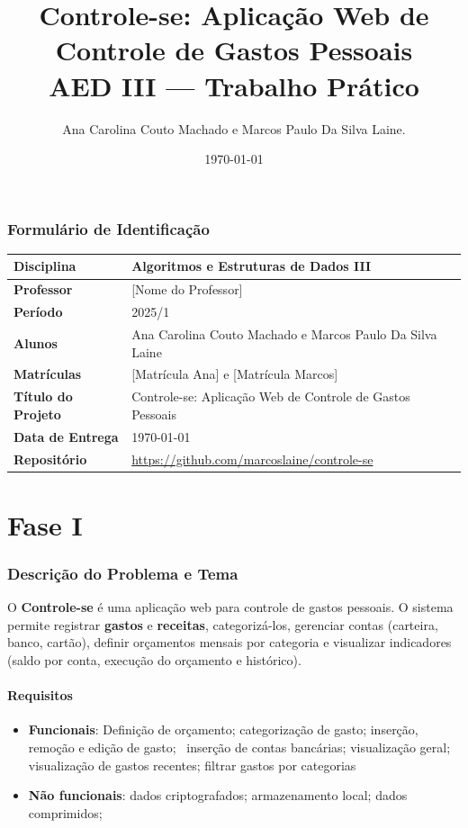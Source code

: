 \documentclass[12pt,a4paper]{article}
\title{Controle-se: Aplicação Web de Controle de Gastos Pessoais\\
\large AED III — Trabalho Prático}
\author{Ana Carolina Couto Machado e Marcos Paulo Da Silva Laine.}
\date{\today}
\begin{document}
\maketitle

\section*{Formulário de Identificação}
\begin{table}[H]
\centering
\begin{tabular}{|l|p{10cm}|}
\hline
\textbf{Disciplina} & Algoritmos e Estruturas de Dados III \\
\hline
\textbf{Professor} & [Nome do Professor] \\
\hline
\textbf{Período} & 2025/1 \\
\hline
\textbf{Alunos} & Ana Carolina Couto Machado e Marcos Paulo Da Silva Laine \\
\hline
\textbf{Matrículas} & [Matrícula Ana] e [Matrícula Marcos] \\
\hline
\textbf{Título do Projeto} & Controle-se: Aplicação Web de Controle de Gastos Pessoais \\
\hline
\textbf{Data de Entrega} & \today \\
\hline
\textbf{Repositório} & \url{https://github.com/marcoslaine/controle-se} \\
\hline
\end{tabular}
\end{table}

\newpage
\part*{Fase I}

\section{Descrição do Problema e Tema}
O \textbf{Controle-se} é uma aplicação web para controle de gastos pessoais. O sistema permite
registrar \textbf{gastos} e \textbf{receitas}, categorizá-los, gerenciar contas (carteira, banco, cartão),
definir orçamentos mensais por categoria e visualizar indicadores (saldo por conta, execução do orçamento e histórico).

\subsection*{Requisitos}
\begin{itemize}
  \item \textbf{Funcionais}: Definição de orçamento; categorização de gasto; inserção, remoção e edição de gasto; \
  inserção de contas bancárias; visualização geral; visualização de gastos recentes; filtrar gastos por categorias
  \item \textbf{Não funcionais}: dados criptografados; armazenamento local; dados comprimidos;
\end{itemize}
\end{document}
